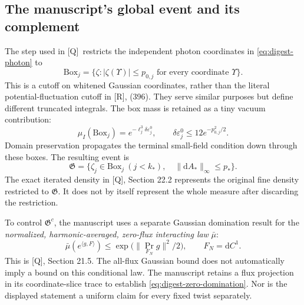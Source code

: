 \documentclass[11pt]{article}
\numberwithin{equation}{section}
\newcommand{\dd}{\mathrm d}
\newcommand{\Q}{\textup{[Q]}}
\newcommand{\UR}{\textup{[R]}}
\begin{document}
\subsection{The manuscript's global event and its complement}

The step used in \Q\ restricts the independent photon coordinates
in \eqref{eq:digest-photon} to
\begin{equation}
 \mathrm{Box}_j=\{\zeta:|\zeta(\Upsilon)|\le p_{0,j}
                              \text{ for every coordinate }\Upsilon\}.
\end{equation}
This is a cutoff on whitened Gaussian coordinates, rather than the
literal potential-fluctuation cutoff in \UR, (396). They serve
similar purposes but define different truncated integrals. The box
mass is retained as a tiny vacuum contribution:
\begin{equation}
 \mu_I(\mathrm{Box}_j)
   =e^{-\ell_j^3\delta\varepsilon_j^0},\qquad
 \delta\varepsilon_j^0\le12e^{-p_{0,j}^2/2}.
\end{equation}
Domain preservation propagates the terminal small-field condition
down through these boxes. The resulting event is
\begin{equation}
 \mathfrak G=\bigl\{\zeta_j\in\mathrm{Box}_j\ (j<k_*),\quad
                     \|\dd A_*\|_\infty\le p_*\bigr\}.
 \label{eq:digest-good-event}
\end{equation}
The exact iterated density in \Q, Section 22.2 represents the original
fine density restricted to $\mathfrak G$. It does not by itself
represent the whole measure after discarding the restriction.

To control $\mathfrak G^c$, the manuscript uses a separate Gaussian
domination result for the \emph{normalized, harmonic-averaged,
zero-flux interacting law} $\bar\mu$:
\begin{equation}
 \bar\mu(e^{\langle g,F\rangle})
  \le \exp\bigl(\|\operatorname{Pr}_{F_N}g\|^2/2\bigr),
 \qquad F_N=\dd C^1.
 \label{eq:digest-zero-domination}
\end{equation}
This is \Q, Section 21.5. The all-flux Gaussian bound does not
automatically imply a bound on this conditional law. The manuscript
retains a flux projection in its coordinate-slice trace to establish
\eqref{eq:digest-zero-domination}. Nor is the displayed statement a
uniform claim for every fixed twist separately.
\end{document}
